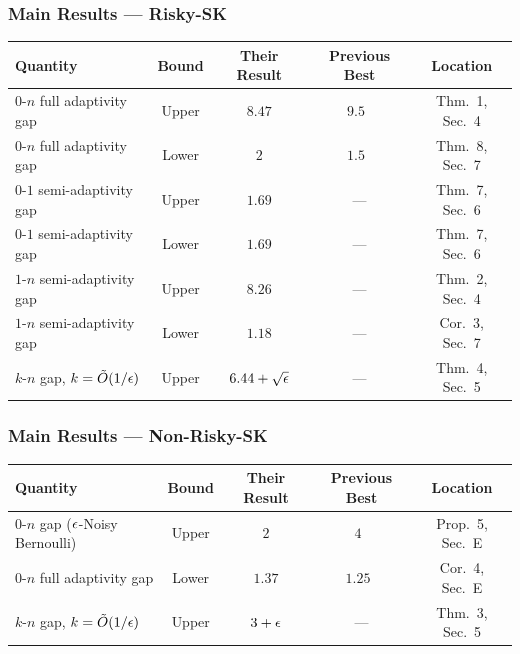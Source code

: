 \subsubsection{Main Results --- Risky-SK}

\begin{center}
\begin{tabular}{l c c c c}
    \hline
    Quantity & Bound & Their Result & Previous Best & Location \\
    \hline
    $0$-$n$ full adaptivity gap & Upper & $8.47$ & $9.5$~\cite{DeanGoemansVondrak2008} & Thm.~1, Sec.~4 \\
    $0$-$n$ full adaptivity gap & Lower & $2$ & $1.5$~\cite{LV14} & Thm.~8, Sec.~7 \\
    $0$-$1$ semi-adaptivity gap & Upper & $1.69$ & --- & Thm.~7, Sec.~6 \\
    $0$-$1$ semi-adaptivity gap & Lower & $1.69$ & --- & Thm.~7, Sec.~6 \\
    $1$-$n$ semi-adaptivity gap & Upper & $8.26$ & --- & Thm.~2, Sec.~4 \\
    $1$-$n$ semi-adaptivity gap & Lower & $1.18$ & --- & Cor.~3, Sec.~7 \\
    $k$-$n$ gap, $k = \tilde{O}(1/\epsilon)$ & Upper & $6.44 + \sqrt{\epsilon}$ & --- & Thm.~4, Sec.~5 \\
    \hline
\end{tabular}
\end{center}

\subsubsection{Main Results --- Non-Risky-SK}

\begin{center}
\begin{tabular}{l c c c c}
    \hline
    Quantity & Bound & Their Result & Previous Best & Location \\
    \hline
    $0$-$n$ gap ($\epsilon$-Noisy Bernoulli) & Upper & $2$ & $4$~\cite{DeanGoemansVondrak2008} & Prop.~5, Sec.~E \\
    $0$-$n$ full adaptivity gap & Lower & $1.37$ & $1.25$~\cite{DeanGoemansVondrak2008} & Cor.~4, Sec.~E \\
    $k$-$n$ gap, $k = \tilde{O}(1/\epsilon)$ & Upper & $3 + \epsilon$ & --- & Thm.~3, Sec.~5 \\
    \hline
\end{tabular}
\end{center}

